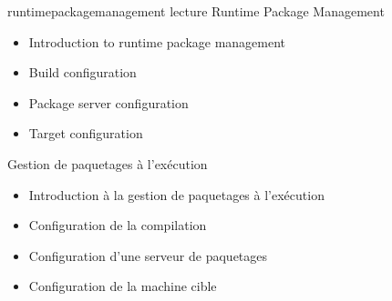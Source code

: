{runtimepackagemanagement}
{lecture}
{Runtime Package Management}
{
  \begin{itemize}
  \item Introduction to runtime package management
  \item Build configuration
  \item Package server configuration
  \item Target configuration
  \end{itemize}
}
{Gestion de paquetages à l'exécution}
{
  \begin{itemize}
  \item Introduction à la gestion de paquetages à l'exécution
  \item Configuration de la compilation
  \item Configuration d'une serveur de paquetages
  \item Configuration de la machine cible
  \end{itemize}
}

\def \onlineagenda {
  \ifthenelse{\equal{\agendalanguage}{french}}{
    \section{Programme de la formation}
  }{
    \section{Training Schedule}
  }
  \begin{tabularx}{\textwidth}{p{2cm}p{5cm}p{11cm}}
  \showagendaday{1}
  \showagendaitem{intro}{lecture}
  \showagendaitem{overview}{lecture}
  \showagendaitem{usingbasics}{lecture}
  \showagendaitem{firstbuild}{lab}
  \showagendaitem{flashingbooting}{lab}
  \showagendaday{2}
  \showagendaitem{usingadvanced}{lecture}
  \showagendaitem{nfsconfiguring}{lab}
  \showagendaitem{writingrecipesbasics}{lecture}
  \showagendaitem{appcompilation}{lab}
  \showagendaitem{writingrecipesadvanced}{lecture}
  \showagendaday{3}
  \showagendaitem{layers}{lecture}
  \showagendaitem{writinglayer}{lab}
  \showagendaitem{extendrecipe}{lab}
  \showagendaitem{writingbsp}{lecture}
  \showagendaitem{kernelchanges}{lab}
  \showagendaitem{distrolayer}{lecture}
  \showagendaday{4}
  \showagendaitem{image}{lecture}
  \showagendaitem{image}{lab}
  \showagendaitem{writingrecipesgoingfurther}{lecture}
  \showagendaitem{licensing}{lecture}
  \showagendaitem{sdk}{lecture}
  \showagendaitem{sdk}{lab}
  \showagendaitem{devtool}{lecture}
  \showagendaitem{devtool}{lab}
  \showagendaitem{automatinglayermanagement}{lecture}
  \showagendaitem{runtimepackagemanagement}{lecture}
  \end{tabularx}
}

